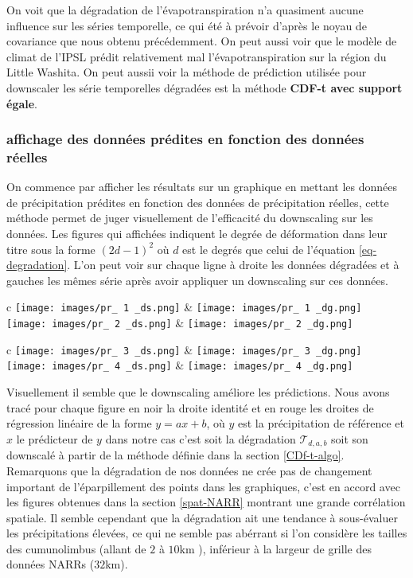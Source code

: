 \documentclass[a4paper,10pt]{article}
\begin{document}
	On voit que la dégradation de l'évapotranspiration n'a quasiment aucune influence sur les séries temporelle, ce qui été à prévoir d'après le noyau de covariance que nous obtenu précédemment. On peut aussi voir que le modèle de climat de l'IPSL prédit relativement mal l'évapotranspiration sur la région du Little Washita. On peut aussii voir la méthode de prédiction utilisée pour downscaler les série temporelles dégradées est la méthode  \textbf{CDF-t avec support égale}. 
	
	\subsubsection{affichage des données prédites en fonction des données réelles}
	
	On commence par afficher les résultats sur un graphique en mettant les données de précipitation prédites en fonction des données de précipitation réelles, cette méthode permet de juger visuellement de l'efficacité du downscaling sur les données. Les figures qui affichées indiquent le degrée de déformation dans leur titre sous la forme $(2d-1)^2$ où $d$ est le degrés que celui de l'équation \eqref{eq-degradation}. L'on peut voir sur chaque ligne à droite les données dégradées et à gauches les mêmes série après avoir appliquer un downscaling sur ces données.
	
	\hspace{-1cm}
	\begin{tabular}{c} 
		\texttt{[image: images/pr\_ 1 \_ds.png]} & \texttt{[image: images/pr\_ 1 \_dg.png]}  \\ 
		\texttt{[image: images/pr\_ 2 \_ds.png]} & \texttt{[image: images/pr\_ 2 \_dg.png]}  \\
	\end{tabular}
	
	\hspace{-1cm}
	\begin{tabular}{c}
		\texttt{[image: images/pr\_ 3 \_ds.png]} & \texttt{[image: images/pr\_ 3 \_dg.png]}   \\
		\texttt{[image: images/pr\_  4 \_ds.png]} & \texttt{[image: images/pr\_ 4 \_dg.png]}  \\
	\end{tabular}
	
	Visuellement il semble que le downscaling améliore les prédictions. Nous avons tracé pour chaque figure en noir la droite identité et en rouge les droites de régression linéaire de la forme $y=ax+b$, où $y$ est la précipitation de référence et $x$ le prédicteur de $y$ dans notre cas c'est soit la dégradation $\mathcal{T}_{d,a,b}$ soit son downscalé à partir de la méthode définie dans la section \ref{CDf-t-algo}. Remarquons que la dégradation de nos données ne crée pas de changement important de l'éparpillement des points dans les graphiques, c'est en accord avec les figures obtenues dans la section \ref{spat-NARR} montrant une grande corrélation spatiale. Il semble cependant que la dégradation ait une tendance à sous-évaluer les précipitations élevées, ce qui ne semble pas abérrant si l'on considère les tailles des cumunolimbus (allant de $2$ à $10$km ), inférieur à la largeur de grille des données NARRs ($32$km). 
	
\end{document}

